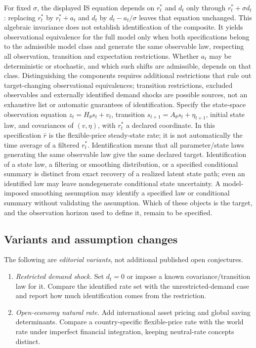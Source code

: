 \documentclass[11pt,a4paper]{article}
\begin{document}
For fixed \(\sigma\), the displayed IS equation depends on \(r_t^*\) and \(d_t\) only through \(r_t^*+\sigma d_t\): replacing \(r_t^*\) by \(r_t^*+a_t\) and \(d_t\) by \(d_t-a_t/\sigma\) leaves that equation unchanged. This algebraic invariance does not establish identification of the composite. It yields observational equivalence for the full model only when both specifications belong to the admissible model class and generate the same observable law, respecting all observation, transition and expectation restrictions. Whether \(a_t\) may be deterministic or stochastic, and which such shifts are admissible, depends on that class. Distinguishing the components requires additional restrictions that rule out target-changing observational equivalences; transition restrictions, excluded observables and externally identified demand shocks are possible sources, not an exhaustive list or automatic guarantees of identification. Specify the state-space observation equation \(z_t=H_\theta s_t+v_t\), transition \(s_{t+1}=A_\theta s_t+\eta_{t+1}\), initial state law, and covariances of \((v,\eta)\), with \(r_t^*\) a declared coordinate. In this specification \(\bar r\) is the flexible-price steady-state rate; it is not automatically the time average of a filtered \(r_t^*\). Identification means that all parameter/state laws generating the same observable law give the same declared target. Identification of a state law, a filtering or smoothing distribution, or a specified conditional summary is distinct from exact recovery of a realized latent state path; even an identified law may leave nondegenerate conditional state uncertainty. A model-imposed smoothing assumption may identify a specified law or conditional summary without validating the assumption. Which of these objects is the target, and the observation horizon used to define it, remain to be specified.
\subsection*{Variants and assumption changes}
The following are \emph{editorial variants}, not additional published open conjectures.
\begin{enumerate}
\item \emph{Restricted demand shock.} Set \(d_t=0\) or impose a known covariance/transition law for it. Compare the identified rate set with the unrestricted-demand case and report how much identification comes from the restriction.
\item \emph{Open-economy natural rate.} Add international asset pricing and global saving determinants. Compare a country-specific flexible-price rate with the world rate under imperfect financial integration, keeping neutral-rate concepts distinct.
\end{enumerate}
\end{document}
